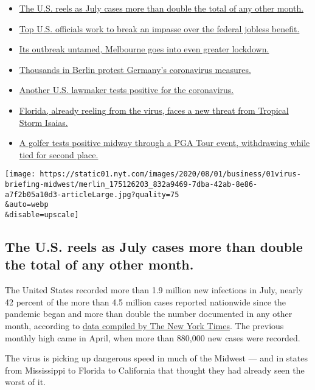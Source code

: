 \begin{itemize}
\tightlist
\item
  \protect\hyperlink{link-34047410}{The U.S. reels as July cases more
  than double the total of any other month.}
\item
  \protect\hyperlink{link-780ec966}{Top U.S. officials work to break an
  impasse over the federal jobless benefit.}
\item
  \protect\hyperlink{link-2bc8948}{Its outbreak untamed, Melbourne goes
  into even greater lockdown.}
\item
  \protect\hyperlink{link-25930521}{Thousands in Berlin protest
  Germany's coronavirus measures.}
\item
  \protect\hyperlink{link-71e54361}{Another U.S. lawmaker tests positive
  for the coronavirus.}
\item
  \protect\hyperlink{link-1e0cb5f3}{Florida, already reeling from the
  virus, faces a new threat from Tropical Storm Isaias.}
\item
  \protect\hyperlink{link-45c905e3}{A golfer tests positive midway
  through a PGA Tour event, withdrawing while tied for second place.}
\end{itemize}

\texttt{[image: https://static01.nyt.com/images/2020/08/01/business/01virus-briefing-midwest/merlin\_175126203\_832a9469-7dba-42ab-8e86-a7f2b05a10d3-articleLarge.jpg?quality=75\\\&auto=webp\\\&disable=upscale]}

\hypertarget{the-us-reels-as-july-cases-more-than-double-the-total-of-any-other-month}{%
\subsection{The U.S. reels as July cases more than double the total of
any other
month.}\label{the-us-reels-as-july-cases-more-than-double-the-total-of-any-other-month}}

The United States recorded more than 1.9 million new infections in July,
nearly 42 percent of the more than 4.5 million cases reported nationwide
since the pandemic began and more than double the number documented in
any other month, according to
\href{https://www.nytimes.com/interactive/2020/us/coronavirus-us-cases.html?action=click\&module=Top\%20Stories\&pgtype=Homepage\#map}{data
compiled by The New York Times}. The previous monthly high came in
April, when more than 880,000 new cases were recorded.

The virus is picking up dangerous speed in much of the Midwest --- and
in states from Mississippi to Florida to California that thought they
had already seen the worst of it.


